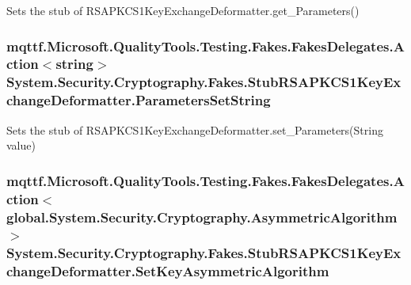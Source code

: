 Sets the stub of R\-S\-A\-P\-K\-C\-S1\-Key\-Exchange\-Deformatter.\-get\-\_\-\-Parameters()

\hypertarget{class_system_1_1_security_1_1_cryptography_1_1_fakes_1_1_stub_r_s_a_p_k_c_s1_key_exchange_deformatter_a0a1baf42d89b08385e528670f7985ce9}{
\subsubsection[{Parameters\-Set\-String}]{\setlength{\rightskip}{0pt plus 5cm}mqttf.\-Microsoft.\-Quality\-Tools.\-Testing.\-Fakes.\-Fakes\-Delegates.\-Action$<$string$>$ System.\-Security.\-Cryptography.\-Fakes.\-Stub\-R\-S\-A\-P\-K\-C\-S1\-Key\-Exchange\-Deformatter.\-Parameters\-Set\-String}}\label{class_system_1_1_security_1_1_cryptography_1_1_fakes_1_1_stub_r_s_a_p_k_c_s1_key_exchange_deformatter_a0a1baf42d89b08385e528670f7985ce9}


Sets the stub of R\-S\-A\-P\-K\-C\-S1\-Key\-Exchange\-Deformatter.\-set\-\_\-\-Parameters(\-String value)

\hypertarget{class_system_1_1_security_1_1_cryptography_1_1_fakes_1_1_stub_r_s_a_p_k_c_s1_key_exchange_deformatter_ae3e9687ec50930ebe78f81160ca7ef70}{
\subsubsection[{Set\-Key\-Asymmetric\-Algorithm}]{\setlength{\rightskip}{0pt plus 5cm}mqttf.\-Microsoft.\-Quality\-Tools.\-Testing.\-Fakes.\-Fakes\-Delegates.\-Action$<$global.\-System.\-Security.\-Cryptography.\-Asymmetric\-Algorithm$>$ System.\-Security.\-Cryptography.\-Fakes.\-Stub\-R\-S\-A\-P\-K\-C\-S1\-Key\-Exchange\-Deformatter.\-Set\-Key\-Asymmetric\-Algorithm}}\label{class_system_1_1_security_1_1_cryptography_1_1_fakes_1_1_stub_r_s_a_p_k_c_s1_key_exchange_deformatter_ae3e9687ec50930ebe78f81160ca7ef70}


